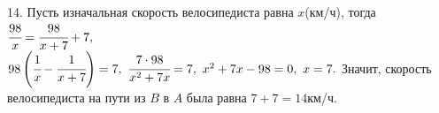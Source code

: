 14. Пусть изначальная скорость велосипедиста равна $x$(км/ч), тогда $\cfrac{98}{x}=\cfrac{98}{x+7}+7,$\\$
98\left(\cfrac{1}{x}-\cfrac{1}{x+7}\right)=7,\ \cfrac{7\cdot98}{x^2+7x}=7,\ x^2+7x-98=0,\ x=7.$ Значит, скорость велосипедиста на пути из $B$ в $A$ была равна $7+7=14$км/ч.\\
